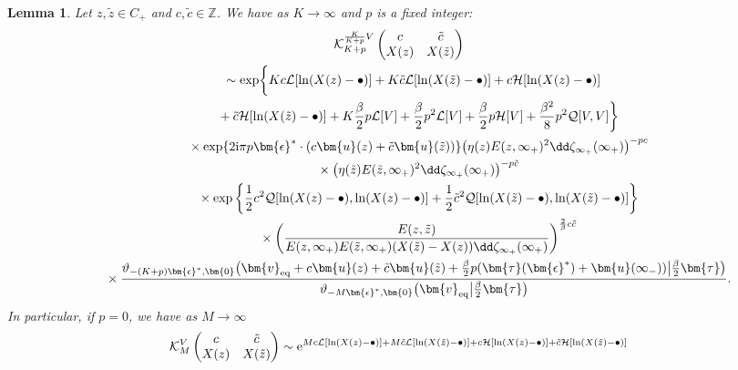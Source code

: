 \documentclass[10pt,a4paper]{amsart}
\numberwithin{equation}{section}
\newtheorem{Lemma}[Theorem]{Lemma}
\begin{document}
\begin{Lemma}\label{Kasymint}\allowdisplaybreaks Let $z,\tilde{z} \in C_+$ and $c,\tilde{c} \in \mathbb{Z}$. We have as $K \rightarrow \infty$ and $p$ is a fixed integer:
\begin{gather*}
	  \mathcal{K}^{\frac{K}{K + p}V}_{K + p}\left(\begin{matrix}
										 c & \tilde{c} \\
										 X(z) & X(\tilde{z})
									 \end{matrix}\right) \\
	\qquad{} \sim\exp\biggl\{Kc \mathcal{L}[\ln(X(z) - \bullet)] + K\tilde{c}\mathcal{L}[\ln(X(\tilde{z}) - \bullet)] + c\mathcal{H}[\ln(X(z) - \bullet)]\\
\qquad\quad{} + \tilde{c}\mathcal{H}[\ln(X(\tilde{z}) - \bullet)] + K\frac{\beta}{2}p\mathcal{L}[V] + \frac{\beta}{2}p^2 \mathcal{L}[V] + \frac{\beta}{2}p\mathcal{H}[V] + \frac{\beta^2}{8}p^2 \mathcal{Q}[V,V]\biggr\} \\
\qquad\quad{} \times \exp\{2{\rm i}\pi p \bm{\epsilon}^* \cdot (c \bm{u}(z) + \tilde{c} \bm{u}(\tilde{z}))\} \bigl(\eta(z)E(z,\infty_+)^{2}\dd \zeta_{\infty_+}(\infty_+)\bigr)^{-pc} \\
\qquad\quad{} \times
\bigl(\eta( \tilde{z})E(\tilde{z},\infty_+)^{2}\dd \zeta_{\infty_+}(\infty_+)\bigr)^{-p\tilde{c}} \\
\qquad\quad{} \times\exp\left\{\frac{1}{2}c^2 \mathcal{Q}[\ln(X(z) - \bullet),\ln(X(z) - \bullet)] + \frac{1}{2} \tilde{c}^2 \mathcal{Q}[\ln(X(\tilde{z}) - \bullet),\ln(X(\tilde{z}) - \bullet)]\right\} \\
\qquad\quad{} \times\left(\frac{E(z,\tilde{z})}{E(z,\infty_+)E(\tilde{z},\infty_+)(X(\tilde{z}) - X(z))\dd \zeta_{\infty_+}(\infty_+)}\right)^{\frac{2}{\beta}c\tilde{c}} \\
\qquad\quad{}
 \times \frac{\vartheta_{-(K + p)\bm{\epsilon}^*,\bm{0}}\bigl(\bm{v}_{{\rm eq}} + c\bm{u}(z) + \tilde{c}\bm{u}(\tilde{z}) + \frac{\beta}{2} p(\bm{\tau}(\bm{\epsilon}^{*}) + \bm{u}(\infty_-)) \big| \frac{\beta}{2} \bm{\tau}\bigr)}{\vartheta_{-M\bm{\epsilon}^{*},\bm{0}}\bigl(\bm{v}_{{\rm eq}}\big|\frac{\beta}{2}\bm{\tau}\bigr)}.
\end{gather*}
In particular, if $p = 0$, we have as $M \rightarrow \infty$
\begin{align*}
	\mathcal{K}^{V}_{M}\left(\begin{matrix} c & \tilde{c} \\ X(z) & X(\tilde{z}) \end{matrix}\right) &{}\sim{\rm e}^{Mc \mathcal{L}[\ln(X(z) - \bullet)] + M\tilde{c}\mathcal{L}[\ln(X(\tilde{z}) - \bullet)] + c\mathcal{H}[\ln(X(z) - \bullet)] + \tilde{c}\mathcal{H}[\ln(X(\tilde{z}) - \bullet)]} \\

\end{align*}
\end{Lemma}
\end{document}

